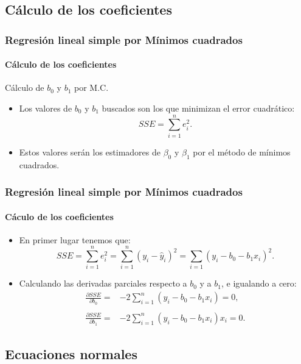 \subsection{Cálculo de los coeficientes}
\begin{frame}
\frametitle{Regresión lineal simple por Mínimos cuadrados}

\framesubtitle{Cálculo de los coeficientes}

\begin{block}{Cálculo de $b_0$ y $b_1$ por M.C.}
\begin{itemize}
\item<2->{Los valores de $b_0$ y $b_1$ buscados son los que minimizan el
error cuadrático:
$$SSE=\sum_{i=1}^n e_i^2.$$}
\item<3->{Estos valores serán los estimadores de $\beta_0$ y $\beta_1$ por el método de mínimos
cuadrados.}
\end{itemize}
\end{block}
\end{frame}
\begin{frame}
\frametitle{Regresión lineal simple por Mínimos cuadrados}

\framesubtitle{Cáculo de los coeficientes}

\begin{itemize}
\item<2->{En primer lugar tenemos que:
$$SSE=\sum_{i=1}^n e_i^2=\sum_{i=1}^n (y_i-\hat{y}_i)^2=\sum_{i=1}(y_i-b_0-b_1 x_i)^2.$$}
\item<3->{Calculando las derivadas parciales respecto a $b_0$ y a $b_1$, e
igualando a cero:
$$
\begin{array}{ll}\frac{\partial SSE}{\partial b_0}=&-2\sum\limits_{i=1}^n (y_i -b_0-b_1 x_i)=0,\\ & \\
\frac{\partial SSE}{\partial b_1}=&-2\sum\limits_{i=1}^n (y_i -b_0-b_1
x_i) x_i =0.
\end{array}
$$}
\end{itemize}
\end{frame}

\subsection{Ecuaciones normales}

